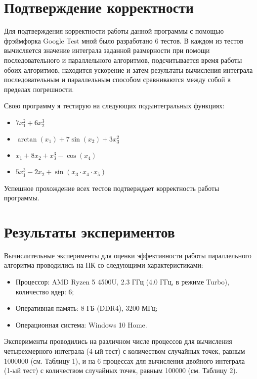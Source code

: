 \documentclass{report}
\begin{document}
\section*{Подтверждение корректности}
Для подтверждения корректности работы данной программы с помощью фрэймфорка Google Test мной было разработано 6 тестов. В каждом из тестов вычисляется значение интеграла заданной размерности при помощи последовательного и параллельного алгоритмов, подсчитывается время работы обоих алгоритмов, находится ускорение и затем результаты вычисления интеграла последовательным и параллельным способом сравниваются между собой в пределах погрешности.
\par Свою программу я тестирую на следующих подынтегральных функциях:
\begin{itemize}
  \item $7x_1^2 + 6x_2^3$
  \item $\arctan(x_1) + 7\sin(x_2) + 3x_3^2$
  \item $x_1 + 8x_2 + x_3^3 - \cos(x_4)$
  \item $5x_1^3 - 2x_2 + \sin(x_3 \cdot x_4 \cdot x_5)$
\end{itemize}
\par Успешное прохождение всех тестов подтверждает корректность работы программы.
\newpage

\section*{Результаты экспериментов}
Вычислительные эксперименты для оценки эффективности работы параллельного алгоритма проводились на ПК со следующими характеристиками:
\begin{itemize}
\item Процессор: AMD Ryzen 5 4500U, 2.3 ГГц (4.0 ГГц, в режиме Turbo), количество ядер: 6;
\item Оперативная память: 8 ГБ (DDR4), 3200 МГц;
\item Операционная система: Windows 10 Home.
\end{itemize}

\par Эксперименты проводились на различном числе процессов для вычисления четырехмерного интеграла (4-ый тест) с количеством случайных точек, равным 1000000 (см. Таблицу 1), и на 6 процессах для вычисления двойного интеграла (1-ый тест) с количеством случайных точек, равным 100000 (см. Таблицу 2).
\end{document}
